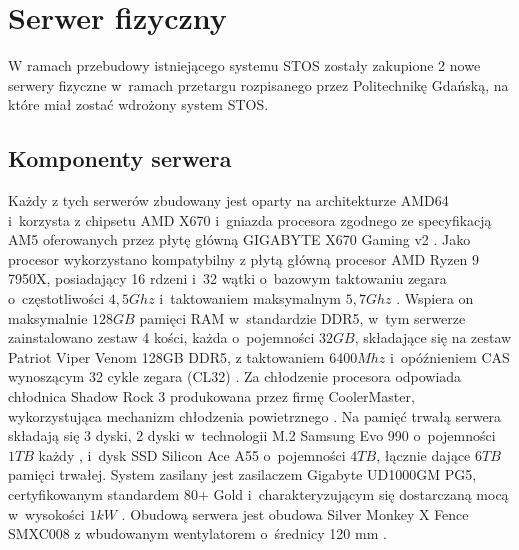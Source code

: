 \section{Serwer fizyczny}
W ramach przebudowy istniejącego systemu STOS zostały zakupione 2 nowe serwery fizyczne w~ramach przetargu rozpisanego przez Politechnikę Gdańską, na które miał zostać wdrożony system STOS.

\subsection{Komponenty serwera}
Każdy z tych serwerów zbudowany jest oparty na architekturze AMD64 i~korzysta z chipsetu AMD X670 i~gniazda procesora zgodnego ze specyfikacją AM5 oferowanych przez płytę główną GIGABYTE X670 Gaming v2 \cite{gigabyteX670}. Jako procesor wykorzystano kompatybilny z płytą główną procesor AMD Ryzen 9 7950X, posiadający 16 rdzeni i~32 wątki o~bazowym taktowaniu zegara o~częstotliwości $4,5 Ghz$ i~taktowaniem maksymalnym $5,7 Ghz$ \cite{ryzen}. Wspiera on maksymalnie $128 GB$ pamięci RAM w~standardzie DDR5, w~tym serwerze zainstalowano zestaw 4 kości, każda o~pojemności $32 GB$, składające się na zestaw Patriot Viper Venom 128GB DDR5, z taktowaniem $6400 Mhz$ i~opóźnieniem CAS wynoszącym 32 cykle zegara (CL32) \cite{patriotRam}. Za chłodzenie procesora odpowiada chłodnica Shadow Rock 3 produkowana przez firmę CoolerMaster, wykorzystująca mechanizm chłodzenia powietrznego \cite{coolermaster}. Na pamięć trwałą serwera składają się 3 dyski, 2 dyski w~technologii M.2 Samsung Evo 990 o~pojemności $1 TB$ każdy \cite{samsungSsd}, i~dysk SSD Silicon Ace A55 \cite{sataSsd} o~pojemności $4 TB$, łącznie dające $6 TB$ pamięci trwałej. System zasilany jest zasilaczem Gigabyte UD1000GM PG5, certyfikowanym standardem 80+ Gold i~charakteryzującym się dostarczaną mocą w~wysokości $1 kW$ \cite{zasilka}.  Obudową serwera jest obudowa Silver Monkey X Fence SMXC008 z wbudowanym wentylatorem o~średnicy 120 mm \cite{obudowa}.

